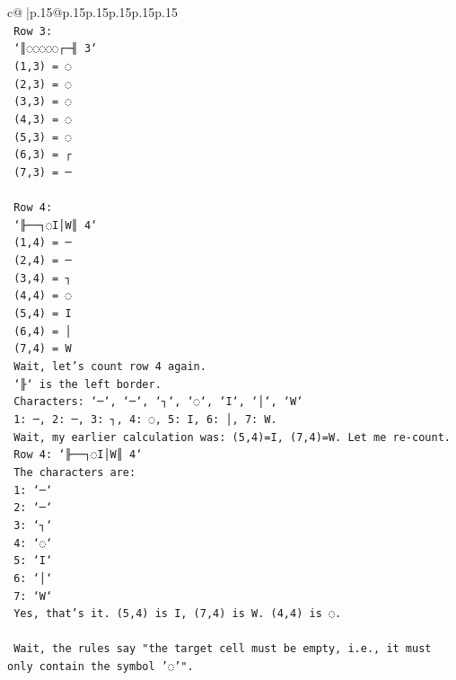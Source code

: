 \documentclass{article}
\begin{document}
{\begin{supertabular}{c@{$\;$}|p{.15\linewidth}@{}p{.15\linewidth}p{.15\linewidth}p{.15\linewidth}p{.15\linewidth}p{.15\linewidth}}
{{{\\ 
\texttt{    Row 3:} \\
\texttt{    `║◌◌◌◌◌┌─╢ 3`} \\
\texttt{    (1,3) = ◌} \\
\texttt{    (2,3) = ◌} \\
\texttt{    (3,3) = ◌} \\
\texttt{    (4,3) = ◌} \\
\texttt{    (5,3) = ◌} \\
\texttt{    (6,3) = ┌} \\
\texttt{    (7,3) = ─} \\
\\ 
\texttt{    Row 4:} \\
\texttt{    `╟──┐◌I│W║ 4`} \\
\texttt{    (1,4) = ─} \\
\texttt{    (2,4) = ─} \\
\texttt{    (3,4) = ┐} \\
\texttt{    (4,4) = ◌} \\
\texttt{    (5,4) = I} \\
\texttt{    (6,4) = │} \\
\texttt{    (7,4) = W} \\
\texttt{    Wait, let's count row 4 again.} \\
\texttt{    `╟` is the left border.} \\
\texttt{    Characters: `─`, `─`, `┐`, `◌`, `I`, `│`, `W`} \\
\texttt{    1: ─, 2: ─, 3: ┐, 4: ◌, 5: I, 6: │, 7: W.} \\
\texttt{    Wait, my earlier calculation was: (5,4)=I, (7,4)=W. Let me re{-}count.} \\
\texttt{    Row 4: `╟──┐◌I│W║ 4`} \\
\texttt{    The characters are:} \\
\texttt{    1: `─`} \\
\texttt{    2: `─`} \\
\texttt{    3: `┐`} \\
\texttt{    4: `◌`} \\
\texttt{    5: `I`} \\
\texttt{    6: `│`} \\
\texttt{    7: `W`} \\
\texttt{    Yes, that's it. (5,4) is I, (7,4) is W. (4,4) is ◌.} \\
\\ 
\texttt{    Wait, the rules say "the target cell must be empty, i.e., it must only contain the symbol '◌'".} \\
}}}
\end{supertabular}}
\end{document}
